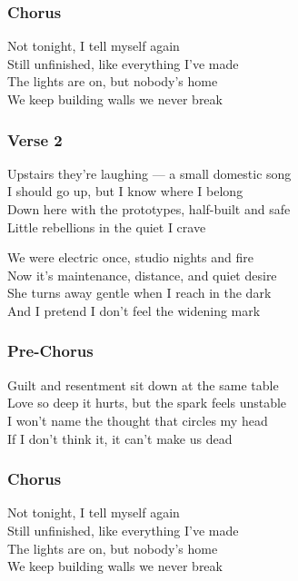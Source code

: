 \subsubsection{Chorus}\label{chorus-76}

Not tonight, I tell myself again\\
Still unfinished, like everything I've made\\
The lights are on, but nobody's home\\
We keep building walls we never break

\subsubsection{Verse 2}\label{verse-2-25}

Upstairs they're laughing --- a small domestic song\\
I should go up, but I know where I belong\\
Down here with the prototypes, half-built and safe\\
Little rebellions in the quiet I crave

We were electric once, studio nights and fire\\
Now it's maintenance, distance, and quiet desire\\
She turns away gentle when I reach in the dark\\
And I pretend I don't feel the widening mark

\subsubsection{Pre-Chorus}\label{pre-chorus-64}

Guilt and resentment sit down at the same table\\
Love so deep it hurts, but the spark feels unstable\\
I won't name the thought that circles my head\\
If I don't think it, it can't make us dead

\subsubsection{Chorus}\label{chorus-77}

Not tonight, I tell myself again\\
Still unfinished, like everything I've made\\
The lights are on, but nobody's home\\
We keep building walls we never break

